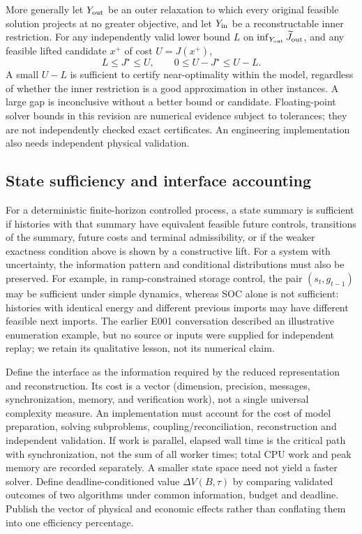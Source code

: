\documentclass[11pt,letterpaper]{article}
\begin{document}
More generally let $Y_{\rm out}$ be an outer relaxation to which every original feasible solution projects at no greater objective, and let $Y_{\rm in}$ be a reconstructable inner restriction. For any independently valid lower bound $L$ on $\inf_{Y_{\rm out}}\widetilde J_{\rm out}$, and any feasible lifted candidate $x^+$ of cost $U=J(x^+)$,
\begin{equation}
L\le J^\star\le U,\qquad 0\le U-J^\star\le U-L.\label{eq:sandwich}
\end{equation}
A small $U-L$ is sufficient to certify near-optimality within the model, regardless of whether the inner restriction is a good approximation in other instances. A large gap is inconclusive without a better bound or candidate. Floating-point solver bounds in this revision are numerical evidence subject to tolerances; they are not independently checked exact certificates. An engineering implementation also needs independent physical validation.

\subsection{State sufficiency and interface accounting}
For a deterministic finite-horizon controlled process, a state summary is sufficient if histories with that summary have equivalent feasible future controls, transitions of the summary, future costs and terminal admissibility, or if the weaker exactness condition above is shown by a constructive lift. For a system with uncertainty, the information pattern and conditional distributions must also be preserved. For example, in ramp-constrained storage control, the pair $(s_t,g_{t-1})$ may be sufficient under simple dynamics, whereas SOC alone is not sufficient: histories with identical energy and different previous imports may have different feasible next imports. The earlier E001 conversation described an illustrative enumeration example, but no source or inputs were supplied for independent replay; we retain its qualitative lesson, not its numerical claim.

Define the interface as the information required by the reduced representation and reconstruction. Its cost is a vector (dimension, precision, messages, synchronization, memory, and verification work), not a single universal complexity measure. An implementation must account for the cost of model preparation, solving subproblems, coupling/reconciliation, reconstruction and independent validation. If work is parallel, elapsed wall time is the critical path with synchronization, not the sum of all worker times; total CPU work and peak memory are recorded separately. A smaller state space need not yield a faster solver. Define deadline-conditioned value $\Delta V(B,\tau)$ by comparing validated outcomes of two algorithms under common information, budget and deadline. Publish the vector of physical and economic effects rather than conflating them into one efficiency percentage.
\end{document}

